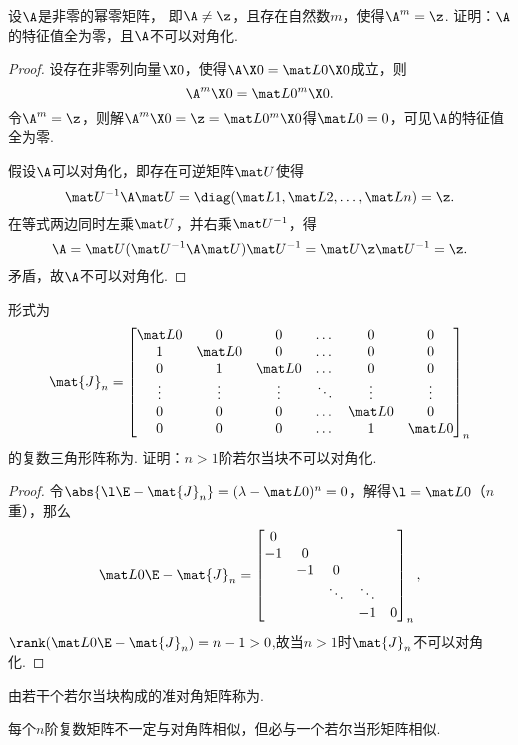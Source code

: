 \begin{example}
设\(\A\)是非零的幂零矩阵，%
即\(\A\neq\z\)，且存在自然数\(m\)，使得\(\A^m=\z\).
证明：\(\A\)的特征值全为零，且\(\A\)不可以对角化.
\begin{proof}
设存在非零列向量\(\X0\)，使得\(\A\X0=\L0\X0\)成立，则\[
\A^m\X0=\L0^m\X0.
\]
令\(\A^m=\z\)，则解\(\A^m\X0=\z=\L0^m\X0\)得\(\L0=0\)，可见\(\A\)的特征值全为零.

假设\(\A\)可以对角化，即存在可逆矩阵\(\P\)使得\[
\P^{-1}\A\P = \diag(\L{1},\L{2},\dotsc,\L{n}) = \z.
\]
在等式两边同时左乘\(\P\)，并右乘\(\P^{-1}\)，得\[
\A = \P(\P^{-1}\A\P)\P^{-1} = \P\z\P^{-1} = \z.
\]矛盾，故\(\A\)不可以对角化.
\end{proof}
\end{example}

\begin{example}
\def\J{\mat{J}_n}
形式为\[
\J = \begin{bmatrix}
\L0 & 0 & 0 & \dots & 0 & 0 \\
1 & \L0 & 0 & \dots & 0 & 0 \\
0 & 1 & \L0 & \dots & 0 & 0 \\
\vdots & \vdots & \vdots & \ddots & \vdots & \vdots \\
0 & 0 & 0 & \dots & \L0 & 0 \\
0 & 0 & 0 & \dots & 1 & \L0
\end{bmatrix}_n
\]的复数三角形阵称为.
证明：\(n>1\)阶若尔当块不可以对角化.
\begin{proof}
令\(\abs{\l\E-\J}=(\lambda-\L0)^n=0\)，解得\(\l=\L0\)（\(n\)重），那么\[
\L0\E-\J = \begin{bmatrix}
0 \\
-1 & 0 \\
& -1 & 0 \\
& & \ddots & \ddots \\
& & & -1 & 0
\end{bmatrix}_n,
\]\(\rank(\L0\E-\J)=n-1 > 0\),故当\(n>1\)时\(\J\)不可以对角化.
\end{proof}
\end{example}

\begin{definition}
由若干个若尔当块构成的准对角矩阵称为.
\end{definition}

\begin{theorem}
每个\(n\)阶复数矩阵不一定与对角阵相似，但必与一个若尔当形矩阵相似.
\end{theorem}


